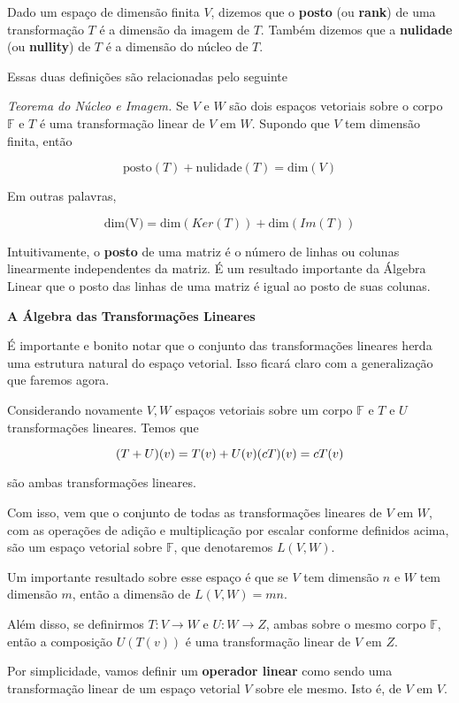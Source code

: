 \documentclass[
]{article}
\begin{document}
Dado um espaço de dimensão finita \(V\), dizemos que o \textbf{posto}
(ou \textbf{rank}) de uma transformação \(T\) é a dimensão da imagem de
\(T\). Também dizemos que a \textbf{nulidade} (ou \textbf{nullity}) de
\(T\) é a dimensão do núcleo de \(T\).

Essas duas definições são relacionadas pelo seguinte

\emph{Teorema do Núcleo e Imagem.} Se \(V\) e \(W\) são dois espaços
vetoriais sobre o corpo \(\mathbb{F}\) e \(T\) é uma transformação
linear de \(V\) em \(W\). Supondo que \(V\) tem dimensão finita, então

\[\text{posto}(T) + \text{nulidade}(T) = \text{dim}(V)\]

Em outras palavras,

\[\text{dim(V)} = \text{dim}(Ker(T)) + \text{dim}(Im(T))\]

Intuitivamente, o \textbf{posto} de uma matriz é o número de linhas ou
colunas linearmente independentes da matriz. É um resultado importante
da Álgebra Linear que o posto das linhas de uma matriz é igual ao posto
de suas colunas.

\textbf{A Álgebra das Transformações Lineares}

É importante e bonito notar que o conjunto das transformações lineares
herda uma estrutura natural do espaço vetorial. Isso ficará claro com a
generalização que faremos agora.

Considerando novamente \(V, W\) espaços vetoriais sobre um corpo
\(\mathbb{F}\) e \(T\) e \(U\) transformações lineares. Temos que

\[(T+U)(v) = T(v)+U(v) \\
(cT)(v) = cT(v)\]

são ambas transformações lineares.

Com isso, vem que o conjunto de todas as transformações lineares de
\(V\) em \(W\), com as operações de adição e multiplicação por escalar
conforme definidos acima, são um espaço vetorial sobre \(\mathbb{F}\),
que denotaremos \(L(V,W)\).

Um importante resultado sobre esse espaço é que se \(V\) tem dimensão
\(n\) e \(W\) tem dimensão \(m\), então a dimensão de \(L(V,W) = mn\).

Além disso, se definirmos \(T:V \to W\) e \(U : W \to Z\), ambas sobre o
mesmo corpo \(\mathbb{F}\), então a composição \(U(T(v))\) é uma
transformação linear de \(V\) em \(Z\).

Por simplicidade, vamos definir um \textbf{operador linear} como sendo
uma transformação linear de um espaço vetorial \(V\) sobre ele mesmo.
Isto é, de \(V\) em \(V\).
\end{document}
